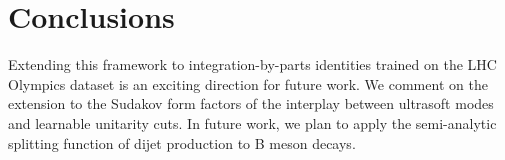\section{Conclusions}\label{sec:conclusions}

Extending this framework to integration-by-parts identities trained on
the LHC Olympics dataset is an exciting direction for future work. We
comment on the extension to the Sudakov form factors of the interplay
between ultrasoft modes and learnable unitarity cuts. In future work, we
plan to apply the semi-analytic splitting function of dijet production
to B meson decays.

